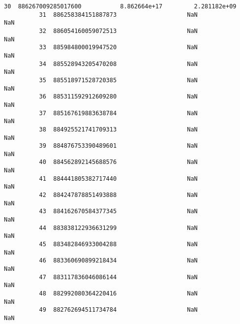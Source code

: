 \documentclass[11pt]{article}
\begin{document}
\begin{Verbatim}[commandchars=\\\{\}]
          30  886267009285017600           8.862664e+17         2.281182e+09   
          31  886258384151887873                    NaN                  NaN   
          32  886054160059072513                    NaN                  NaN   
          33  885984800019947520                    NaN                  NaN   
          34  885528943205470208                    NaN                  NaN   
          35  885518971528720385                    NaN                  NaN   
          36  885311592912609280                    NaN                  NaN   
          37  885167619883638784                    NaN                  NaN   
          38  884925521741709313                    NaN                  NaN   
          39  884876753390489601                    NaN                  NaN   
          40  884562892145688576                    NaN                  NaN   
          41  884441805382717440                    NaN                  NaN   
          42  884247878851493888                    NaN                  NaN   
          43  884162670584377345                    NaN                  NaN   
          44  883838122936631299                    NaN                  NaN   
          45  883482846933004288                    NaN                  NaN   
          46  883360690899218434                    NaN                  NaN   
          47  883117836046086144                    NaN                  NaN   
          48  882992080364220416                    NaN                  NaN   
          49  882762694511734784                    NaN                  NaN   
          

\end{Verbatim}
\end{document}
